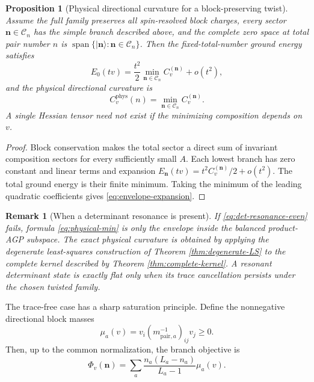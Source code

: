 \documentclass[11pt]{article}
\numberwithin{equation}{section}
\newtheorem{proposition}[theorem]{Proposition}
\newtheorem{remark}[theorem]{Remark}
\newcommand{\cC}{\mathcal C}
\newcommand{\bn}{\mathbf n}
\newcommand{\Span}{\operatorname{span}}
\begin{document}
\begin{proposition}[Physical directional curvature for a block-preserving twist]
\label{prop:lower-envelope}
Assume the full family preserves all spin-resolved block charges, every sector $\bn\in\cC_n$ has the simple branch described above, and the complete zero space at total pair number $n$ is $\Span\{|\bn\rangle:\bn\in\cC_n\}$.  Then the fixed-total-number ground energy satisfies
\begin{equation}
 E_0(tv)=\frac{t^2}{2}
 \min_{\bn\in\cC_n}C_v^{(\bn)}+o(t^2),
 \label{eq:envelope-expansion}
\end{equation}
and the physical directional curvature is
\begin{equation}
 \boxed{
 C_v^{\mathrm{phys}}(n)
 =\min_{\bn\in\cC_n}C_v^{(\bn)}.}
 \label{eq:physical-min}
\end{equation}
A single Hessian tensor need not exist if the minimizing composition depends on $v$.
\end{proposition}

\begin{proof}
Block conservation makes the total sector a direct sum of invariant composition sectors for every sufficiently small $A$.  Each lowest branch has zero constant and linear terms and expansion $E_{\bn}(tv)=t^2C_v^{(\bn)}/2+o(t^2)$.  The total ground energy is their finite minimum.  Taking the minimum of the leading quadratic coefficients gives \eqref{eq:envelope-expansion}.
\end{proof}

\begin{remark}[When a determinant resonance is present]
If \eqref{eq:det-resonance-even} fails, formula \eqref{eq:physical-min} is only the envelope inside the balanced product-AGP subspace.  The exact physical curvature is obtained by applying the degenerate least-squares construction of Theorem \ref{thm:degenerate-LS} to the complete kernel described by Theorem \ref{thm:complete-kernel}.  A resonant determinant state is exactly flat only when its trace cancellation persists under the chosen twisted family.
\end{remark}

The trace-free case has a sharp saturation principle.  Define the nonnegative directional block masses
\begin{equation}
 \mu_a(v)=v_i(m_{\mathrm{pair},a}^{-1})_{ij}v_j\ge0.
 \label{eq:mu-a}
\end{equation}
Then, up to the common normalization, the branch objective is
\begin{equation}
 \Phi_v(\bn)
 =\sum_a\frac{n_a(L_a-n_a)}{L_a-1}\mu_a(v).
 \label{eq:Phi}
\end{equation}
\end{document}

